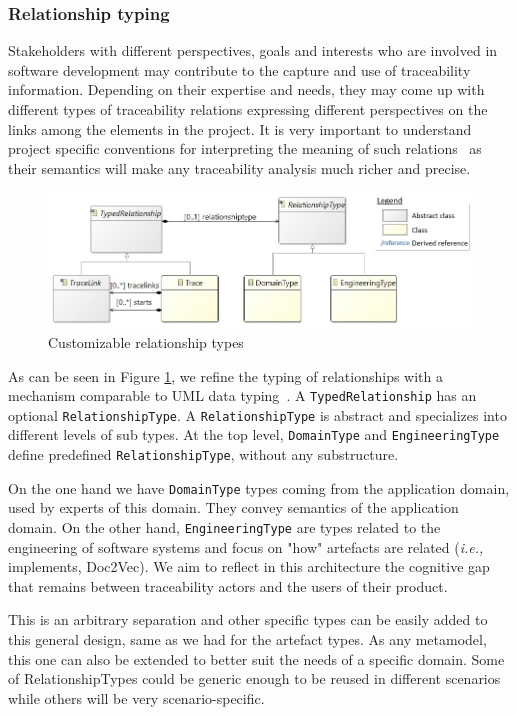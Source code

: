 \subsubsection{Relationship typing}\label{sec:relationshiptype}

Stakeholders with different perspectives, goals and interests who are involved in software development may contribute to the capture and use of traceability information. Depending on their expertise and needs, they may come up with different types of traceability relations expressing different perspectives on the links among the elements in the project. It is very important to understand project specific conventions for interpreting the meaning of such relations~\cite{Spanoudakis2005} as their semantics will make any traceability analysis much richer and precise.

\begin{figure}[h]
	\centering
	\includegraphics[width=.85\linewidth]{images/relationtyping.jpg}
	\caption{Customizable relationship types}
	\label{fig:mm-relation}
\end{figure}
As can be seen in Figure \ref{fig:mm-relation}, we refine the typing of relationships with a mechanism comparable to UML data typing~\cite{rumbaugh2004-UML2}. A \texttt{TypedRelationship} has an optional \texttt{RelationshipType}. A \texttt{RelationshipType} is abstract and specializes into different levels of sub types.
At the top level, \texttt{DomainType} and \texttt{EngineeringType} define predefined \texttt{RelationshipType}, without any substructure. 

On the one hand we have \texttt{DomainType} types coming from the application domain, used by experts of this domain. They convey semantics of the application domain. On the other hand, \texttt{EngineeringType} are types related to the engineering of software systems and focus on "how" artefacts are related (\textit{i.e.,} implements, Doc2Vec).  We aim to reflect in this architecture the cognitive gap that remains between traceability actors and the users of their product. 

This is an arbitrary separation and other specific types can be easily added to this general design, same as we had for the artefact types. As any metamodel, this one can also be extended to better suit the needs of a specific domain. Some of RelationshipTypes could be generic enough to be reused in different scenarios while others will be very scenario-specific.

